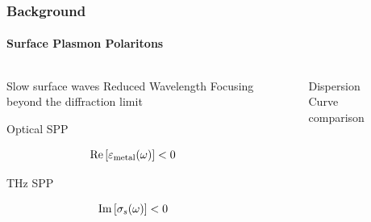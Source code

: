 \documentclass[mathserif,16pt,xcolor=table]{beamer}
\begin{document}
    \begin{frame}
      \frametitle{Background}
      \framesubtitle{Surface Plasmon Polaritons}

      \begin{columns} %
        \begin{column}{.5\textwidth}
          \begin{minipage}[T][.1\textheight][c]{\linewidth}
            \begin{outline}[itemize]
              \1 Slow surface waves
              \1 Reduced Wavelength
              \1 Focusing beyond the diffraction limit
            \end{outline}
            \begin{outline}[itemize]
              \1 Optical SPP
            \end{outline}
            \setlength{\belowdisplayshortskip}{-7pt}
            \setlength{\abovedisplayshortskip}{2pt}
            \begin{equation} \nonumber
              \Re \left[ \varepsilon_{\text{metal}}(\omega)\right] < 0
            \end{equation}
            \begin{outline}[itemize]
              \1 THz SPP
            \end{outline}
            \begin{equation} \nonumber
              \Im \left[ \sigma_{s}(\omega)\right] < 0
            \end{equation}
          \end{minipage}
        \end{column}
        \begin{column}{.5\textwidth}
          \begin{figure}
            \centering \hspace*{-1.25cm}
            \fontsize{6}{7}\selectfont
            \def\svgwidth{1.1\linewidth}
            
            \label{fig:spp_2deg}
            \caption{Dispersion Curve comparison}
          \end{figure}
          \end{column}%
        \end{columns}
      \end{frame}
\end{document}
